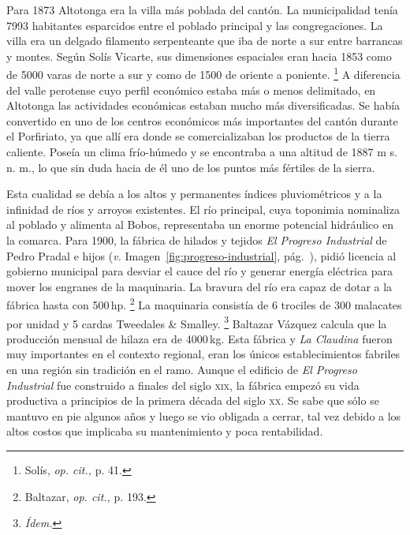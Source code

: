 \documentclass[14pt,twoside,final]{extbook} %
\let\oldfootnote\footnote
\renewcommand\footnote[1]{%
\oldfootnote{\hspace{1mm}#1}}
\begin{document}
Para 1873 Altotonga era la villa más poblada del cantón. La municipalidad tenía 7993 habitantes esparcidos entre el poblado principal y las congregaciones. La villa era un delgado filamento serpenteante que iba de norte a sur entre barrancas y montes. Según Solís Vicarte, sus dimensiones espaciales eran hacia 1853 como de 5000 varas de norte a sur y como de 1500 de oriente a poniente.\footnote{Solís, \emph{op. cit.,} p. 41.} A diferencia del valle perotense cuyo perfil económico estaba más o menos delimitado, en Altotonga las actividades económicas estaban mucho más diversificadas. Se había convertido en uno de los centros económicos más importantes del cantón durante el Porfiriato, ya que allí era donde se comercializaban los productos de la tierra caliente. Poseía un clima frío-húmedo y se encontraba a una altitud de 1887 m s. n. m., lo que sin duda hacia de él uno de los puntos más fértiles de la sierra.

Esta cualidad se debía a los altos y permanentes índices pluviométricos y a la infinidad de ríos y arroyos existentes. El río principal, cuya toponimia nominaliza al poblado y alimenta al Bobos, representaba un enorme potencial hidráulico en la comarca. Para 1900, la fábrica de hilados y tejidos \emph{El Progreso Industrial} de Pedro Pradal e hijos (\emph{v.} Imagen~\ref{fig:progreso-industrial}, pág.~\pageref{fig:progreso-industrial}), pidió licencia al gobierno municipal para desviar el cauce del río y generar energía eléctrica para mover los engranes de la maquinaria. La bravura del río era capaz de dotar a la fábrica hasta con 500\,hp.\footnote{Baltazar, \emph{op. cit.,} p. 193.} La maquinaria consistía de 6 trociles de 300 malacates por unidad y 5 cardas Tweedales \& Smalley.\footnote{\em Ídem.} Baltazar Vázquez calcula que la producción mensual de hilaza era de 4000\,kg. Esta fábrica y \emph{La Claudina} fueron muy importantes en el contexto regional, eran los únicos establecimientos fabriles en una región sin tradición en el ramo. Aunque el edificio de \emph{El Progreso Industrial} fue construido a finales del siglo \textsc{xix}, la fábrica empezó su vida productiva a principios de la primera década del siglo \textsc{xx}. Se sabe que sólo se mantuvo en pie algunos años y luego se vio obligada a cerrar, tal vez debido a los altos costos que implicaba su mantenimiento y poca rentabilidad.
\end{document}
